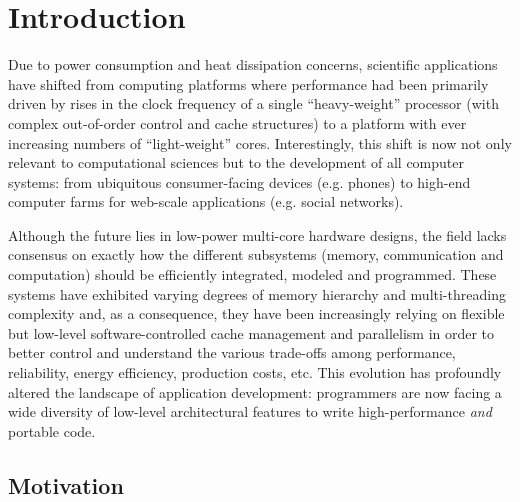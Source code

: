 \documentclass{sig-alternate}
\begin{document}
\section{Introduction}



Due to power consumption and heat dissipation concerns, scientific applications
have shifted from computing platforms where performance had been primarily
driven by rises in the clock frequency of a single ``heavy-weight'' processor
(with complex out-of-order control and cache structures) to a platform with
ever increasing numbers of ``light-weight'' cores. Interestingly, this shift is
now not only relevant to computational sciences but to the development of all
computer systems: from ubiquitous consumer-facing devices (e.g. phones) to
high-end computer farms for web-scale applications (e.g. social networks).


Although the future lies in low-power multi-core hardware designs, the field
lacks consensus on exactly how the different subsystems (memory,
communication and computation) should be efficiently integrated, modeled and
programmed. These systems have exhibited varying degrees of memory hierarchy
and multi-threading complexity and, as a consequence, they have been
increasingly relying on flexible but low-level software-controlled cache
management and parallelism \citep{asanovic2006landscape} in order to better
control and understand the various trade-offs among performance, reliability,
energy efficiency, production costs, etc. This evolution has profoundly
altered the landscape of application development: programmers are now
facing a wide diversity of low-level architectural features to write
high-performance \emph{and} portable code.

\subsection{Motivation}

\end{document}
